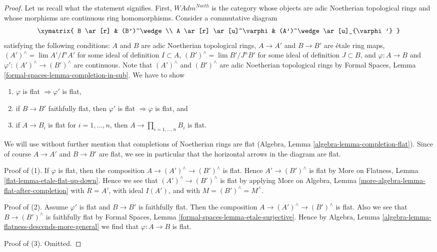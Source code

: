 \begin{proof}
Let us recall what the statement signifies. First, 
$\textit{WAdm}^{Noeth}$ is the category whose objects are
adic Noetherian topological rings and whose morphisms are
continuous ring homomorphisms. Consider a commutative diagram
$$
\xymatrix{
B \ar[r] & (B')^\wedge \\
A \ar[r] \ar[u]^\varphi & (A')^\wedge \ar[u]_{\varphi'}
}
$$
satisfying the following conditions:
$A$ and $B$ are adic Noetherian topological rings,
$A \to A'$ and $B \to B'$ are \'etale ring maps,
$(A')^\wedge = \lim A'/I^nA'$ for some ideal of definition $I \subset A$,
$(B')^\wedge = \lim B'/J^nB'$ for some ideal of definition $J \subset B$, and
$\varphi : A \to B$ and $\varphi' : (A')^\wedge \to (B')^\wedge$
are continuous. Note that $(A')^\wedge$ and $(B')^\wedge$ are
adic Noetherian topological rings by
Formal Spaces, Lemma \ref{formal-spaces-lemma-completion-in-sub}.
We have to show
\begin{enumerate}
\item $\varphi$ is flat $\Rightarrow \varphi'$ is flat,
\item if $B \to B'$ faithfully flat, then $\varphi'$ is flat
$\Rightarrow \varphi$ is flat, and
\item if $A \to B_i$ is flat for $i = 1, \ldots, n$, then
$A \to \prod_{i = 1, \ldots, n} B_i$ is flat.
\end{enumerate}
We will use without further mention that completions of Noetherian rings
are flat (Algebra, Lemma \ref{algebra-lemma-completion-flat}). Since
of course $A \to A'$ and $B \to B'$ are flat, we see in
particular that the horizontal arrows in the diagram are flat.

\medskip\noindent
Proof of (1). If $\varphi$ is flat, then the composition
$A \to (A')^\wedge \to (B')^\wedge$ is flat. Hence $A' \to (B')^\wedge$
is flat by More on Flatness, Lemma \ref{flat-lemma-etale-flat-up-down}.
Hence we see that $(A')^\wedge \to (B')^\wedge$ is flat by applying
More on Algebra, Lemma \ref{more-algebra-lemma-flat-after-completion}
with $R = A'$, with ideal $I(A')$, and with $M = (B')^\wedge = M^\wedge$.

\medskip\noindent
Proof of (2). Assume $\varphi'$ is flat and $B \to B'$ is faithfully flat.
Then the composition $A \to (A')^\wedge \to (B')^\wedge$ is flat.
Also we see that $B \to (B')^\wedge$ is faithfully flat by
Formal Spaces, Lemma
\ref{formal-spaces-lemma-etale-surjective}.
Hence by Algebra, Lemma \ref{algebra-lemma-flatness-descends-more-general}
we find that $\varphi : A \to B$ is flat.

\medskip\noindent
Proof of (3). Omitted.
\end{proof}

